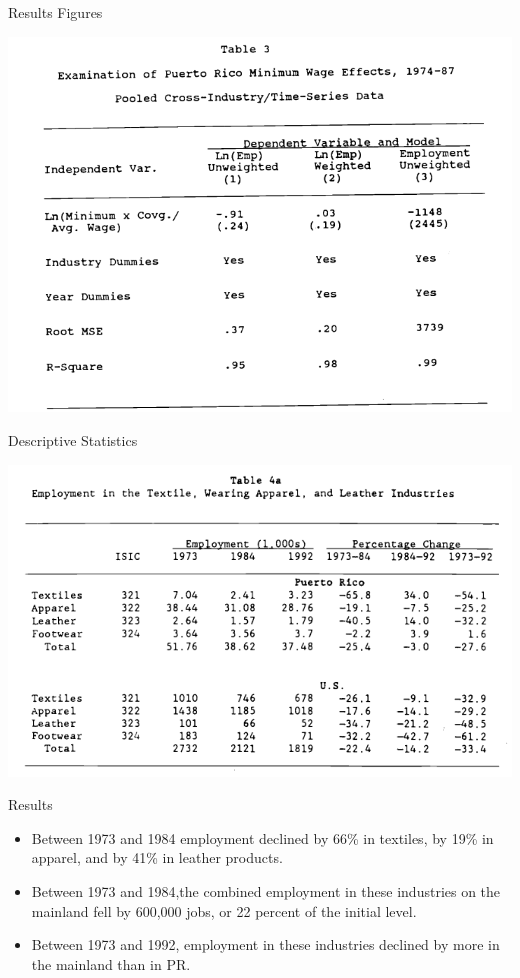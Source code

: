 \documentclass[12pt]{beamer}
\begin{document}
\begin{frame}[allowframebreaks]{Results Figures}
	\begin{center}
		\includegraphics[width=0.8\linewidth]{assets/results.png}
	\end{center}
\end{frame}

\begin{frame}[allowframebreaks]{Descriptive Statistics}
	\begin{center}
		\includegraphics[width=0.8\linewidth]{assets/descriptive.png}
	\end{center}
\end{frame}

\begin{frame}[allowframebreaks]{Results}
	\begin{itemize}
		\item Between 1973 and 1984 employment declined by 66\% in textiles, by 19\% in apparel, and by 41\% in leather products.
		\item Between 1973 and 1984,the combined employment in these industries on the mainland fell by 600,000 jobs, or 22 percent of the initial level.
		\item Between 1973 and 1992, employment in these industries declined by more in the mainland than in PR.
	\end{itemize}
\end{frame}
\end{document}
